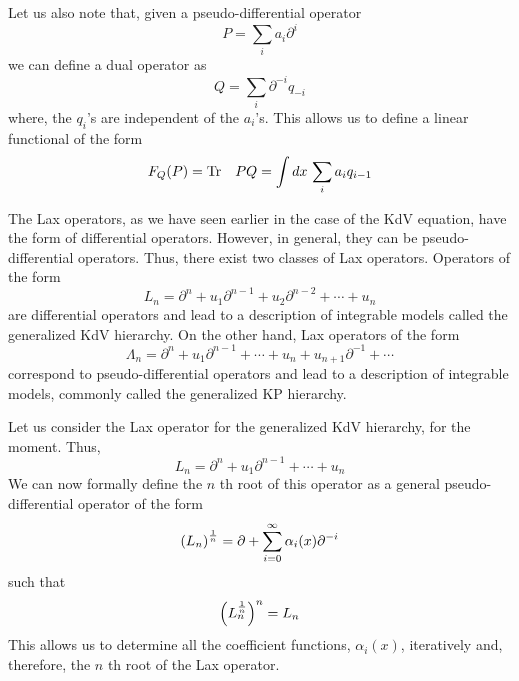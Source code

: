 \documentclass[a4paper,11pt]{article}
\begin{document}
Let us also note that, given a pseudo-differential operator
\begin{equation}
P = \sum_{i} a_{i} \partial^{i}
\end{equation}
we can define a dual operator as
\begin{equation}
Q = \sum_{i} \partial^{-i} q_{-i}
\end{equation}
where, the $q_{i}$'s are independent of the $a_{i}$'s. This allows us
to define a linear functional of the form
\begin{equation}
F_{Q} (P) = {\rm Tr}\quad PQ = \int dx\,\sum_{i} a_{i} q_{i-1}
\end{equation}


The Lax operators, as we have seen earlier in the case of the KdV
equation, have the form of differential operators. However, in
general, they can be pseudo-differential operators. Thus, there exist
two classes of Lax operators. Operators of the form
\begin{equation}
L_{n} = \partial^{n} + u_{1} \partial^{n-1} + u_{2} \partial^{n-2} +
\cdots + u_{n}
\end{equation}
are differential operators and lead to a description of integrable
models called the generalized KdV hierarchy. On the other hand, Lax
operators of the form
\begin{equation}
\Lambda_{n} = \partial^{n} + u_{1} \partial^{n-1} + \cdots + u_{n} +
u_{n+1} \partial^{-1} + \cdots
\end{equation}
correspond to pseudo-differential operators and lead to a description
of integrable models, commonly called the generalized KP hierarchy.

Let us consider the Lax operator for the generalized KdV hierarchy,
for the moment. Thus,
\begin{equation}
L_{n} = \partial^{n} + u_{1} \partial^{n-1} + \cdots + u_{n}
\end{equation}
We can now formally define the $n$ th root of this operator as
a general pseudo-differential operator of the form
\begin{equation}
\left(L_{n}\right)^{1\over n} = \partial + \sum_{i=0}^{\infty}
\alpha_{i}(x) \partial^{-i}
\end{equation}
such that
\begin{equation}
\left(L_{n}^{1\over n}\right)^{n} = L_{n}
\end{equation}
This allows us to determine all the coefficient functions,
$\alpha_{i}(x)$, iteratively and, therefore, the $n$ th root of the
Lax operator.
\end{document}
